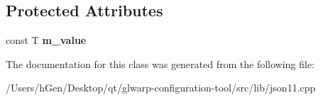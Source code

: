\subsection*{Protected Attributes}
\begin{DoxyCompactItemize}
\item 
\mbox{\label{classjson11_1_1_value_a248561db10925d05532a3c2b3ec5b916}} 
const T {\bfseries m\+\_\+value}
\end{DoxyCompactItemize}


The documentation for this class was generated from the following file\+:\begin{DoxyCompactItemize}
\item 
/\+Users/h\+Gen/\+Desktop/qt/glwarp-\/configuration-\/tool/src/lib/json11.\+cpp\end{DoxyCompactItemize}

